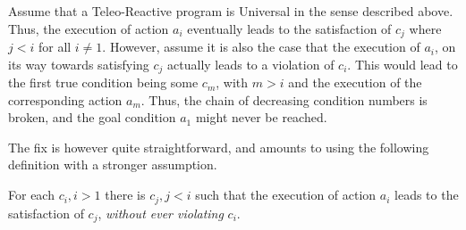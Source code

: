 \begin{example}
 Assume that a Teleo-Reactive program is Universal in the sense described above. 
 Thus, the execution of action $a_i$ eventually leads to the satisfaction of $c_j$ where $j<i$ for all $i\neq 1$.
 However, assume it is also the case that the execution of $a_i$, on its way towards satisfying $c_j$ actually leads to a violation of $c_i$.
 This would lead to the first true condition being some $c_m$, with $m>i$ and the execution of the corresponding action $a_m$.
 Thus, the chain of decreasing condition numbers is broken, and the goal condition $a_1$ might never be reached.
\end{example}

The fix is however quite straightforward, and amounts to using the following definition with a stronger assumption.

\begin{definition}
 For each $c_i, i>1$ there is $c_j, j<i$ such that the execution of action $a_i$ leads to the satisfaction of $c_j$, \emph{without ever violating} $c_i$.
\end{definition}
